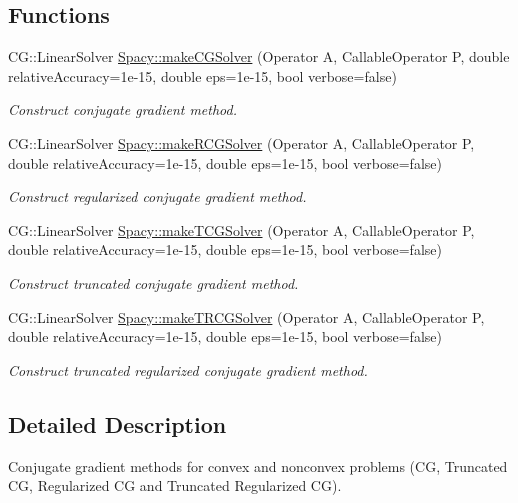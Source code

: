 \subsection*{Functions}
\begin{DoxyCompactItemize}
\item 
C\+G\+::\+Linear\+Solver \hyperlink{group__CGGroup_gaafd9bf87164dd48991d2016aec8bad08_gaafd9bf87164dd48991d2016aec8bad08}{Spacy\+::make\+C\+G\+Solver} (Operator A, Callable\+Operator P, double relative\+Accuracy=1e-\/15, double eps=1e-\/15, bool verbose=false)
\begin{DoxyCompactList}\small\item\em Construct conjugate gradient method. \end{DoxyCompactList}\item 
C\+G\+::\+Linear\+Solver \hyperlink{group__CGGroup_gaf9ddae62858412fe5309d11aac7b8ed3_gaf9ddae62858412fe5309d11aac7b8ed3}{Spacy\+::make\+R\+C\+G\+Solver} (Operator A, Callable\+Operator P, double relative\+Accuracy=1e-\/15, double eps=1e-\/15, bool verbose=false)
\begin{DoxyCompactList}\small\item\em Construct regularized conjugate gradient method. \end{DoxyCompactList}\item 
C\+G\+::\+Linear\+Solver \hyperlink{group__CGGroup_ga5693f62a60708a49f51cf451991b96ec_ga5693f62a60708a49f51cf451991b96ec}{Spacy\+::make\+T\+C\+G\+Solver} (Operator A, Callable\+Operator P, double relative\+Accuracy=1e-\/15, double eps=1e-\/15, bool verbose=false)
\begin{DoxyCompactList}\small\item\em Construct truncated conjugate gradient method. \end{DoxyCompactList}\item 
C\+G\+::\+Linear\+Solver \hyperlink{group__CGGroup_ga66f5afbc97e887274b28be9c94aa3103_ga66f5afbc97e887274b28be9c94aa3103}{Spacy\+::make\+T\+R\+C\+G\+Solver} (Operator A, Callable\+Operator P, double relative\+Accuracy=1e-\/15, double eps=1e-\/15, bool verbose=false)
\begin{DoxyCompactList}\small\item\em Construct truncated regularized conjugate gradient method. \end{DoxyCompactList}\end{DoxyCompactItemize}


\subsection{Detailed Description}
Conjugate gradient methods for convex and nonconvex problems (C\+G, Truncated C\+G, Regularized C\+G and Truncated Regularized C\+G). 



